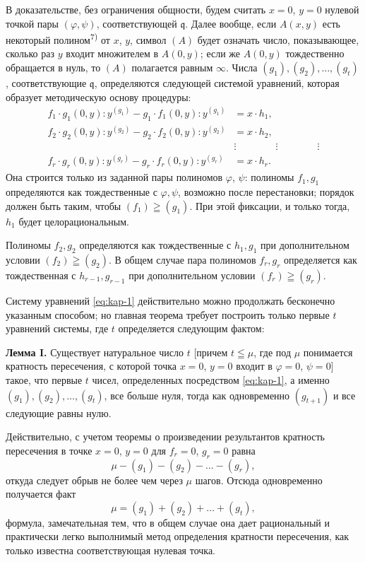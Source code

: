 \documentclass[11pt]{article}
\theoremstyle{plain}
\begin{document}
В доказательстве, без ограничения общности, будем считать $x = 0$,
$y = 0$ нулевой точкой пары $(\varphi, \psi)$, соответствующей
$\mathfrak{q}$. Далее вообще, если $A(x,y)$ есть некоторый
полином\textsuperscript{7)} от $x$, $y$, символ $(A)$ будет означать
число, показывающее, сколько раз $y$ входит множителем в $A(0,y)$;
если же $A(0,y)$ тождественно обращается в нуль, то $(A)$ полагается
равным $\infty$. Числа $(g_{1}), (g_{2}), \ldots, (g_{t})$,
соответствующие $\mathfrak{q}$, определяются следующей системой
уравнений, которая образует методическую основу процедуры:
\begin{equation}\label{eq:kap-1}
\begin{aligned}
f_{1}\cdot g_{1}(0,y):y^{(g_{1})} - g_{1}\cdot f_{1}(0,y):y^{(g_{1})} &= x\cdot h_{1},\\
f_{2}\cdot g_{2}(0,y):y^{(g_{2})} - g_{2}\cdot f_{2}(0,y):y^{(g_{2})} &= x\cdot h_{2},\\
&\vdots \qquad\qquad\vdots\qquad\qquad\vdots\\
f_{r}\cdot g_{r}(0,y):y^{(g_{r})} - g_{r}\cdot f_{r}(0,y):y^{(g_{r})} &= x\cdot h_{r}.
\end{aligned}
\end{equation}
Она строится только из заданной пары полиномов $\varphi$, $\psi$:
полиномы $f_{1}, g_{1}$ определяются как тождественные с
$\varphi, \psi$, возможно после перестановки; порядок должен быть
таким, чтобы $(f_1)\geqq(g_1)$. При этой фиксации, и только
тогда, $h_{1}$ будет целорациональным.

Полиномы $f_{2}, g_{2}$ определяются как тождественные с
$h_{1}, g_{1}$ при дополнительном условии
$(f_2)\geqq(g_2)$. В общем случае пара полиномов
$f_{r}, g_{r}$ определяется как тождественная с $h_{r-1}, g_{r-1}$
при дополнительном условии $(f_r)\geqq(g_r)$.

Систему уравнений \eqref{eq:kap-1} действительно можно продолжать
бесконечно указанным способом; но главная теорема требует построить
только первые $t$ уравнений системы, где $t$ определяется следующим
фактом:

\smallskip
\textbf{Лемма I.} Существует натуральное число $t$ [причем
$t\leqq\mu$, где под $\mu$ понимается кратность пересечения, с
которой точка $x = 0$, $y = 0$ входит в $\varphi = 0$, $\psi = 0$]
такое, что первые $t$ чисел, определенных посредством
\eqref{eq:kap-1}, а именно $(g_{1}), (g_{2}), \ldots, (g_{t})$, все
больше нуля, тогда как одновременно $(g_{t+1})$ и все следующие
равны нулю.

Действительно, с учетом теоремы о произведении результантов кратность
пересечения в точке $x = 0$, $y = 0$ для $f_{r} = 0$, $g_{r} = 0$
равна
\[
\mu-(g_1)-(g_2)-\ldots-(g_r),
\]
откуда следует обрыв не более чем через $\mu$ шагов. Отсюда
одновременно получается факт
\begin{equation}\label{eq:kap-2}
\mu=(g_1)+(g_2)+\ldots+(g_t),
\end{equation}
формула, замечательная тем, что в общем случае она дает рациональный
и практически легко выполнимый метод определения кратности
пересечения, как только известна соответствующая нулевая точка.
\end{document}
